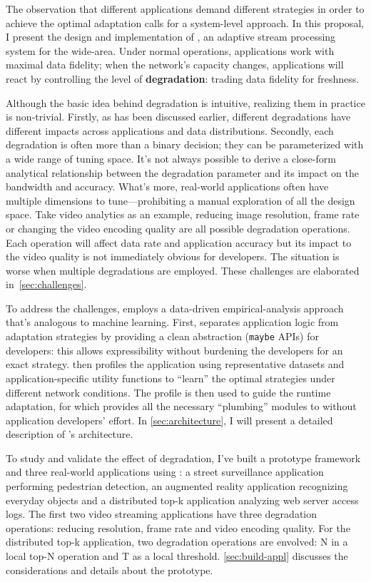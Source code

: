 The observation that different applications demand different strategies in order
to achieve the optimal adaptation calls for a system-level approach. In this
proposal, I present the design and implementation of \sysname{}, an adaptive
stream processing system for the wide-area. Under normal operations, \sysname{}
applications work with maximal data fidelity; when the network's capacity
changes, applications will react by controlling the level of
\textbf{degradation}: trading data fidelity for freshness.

Although the basic idea behind degradation is intuitive, realizing them in
practice is non-trivial. Firstly, as has been discussed earlier, different
degradations have different impacts across applications and data
distributions. Secondly, each degradation is often more than a binary decision;
they can be parameterized with a wide range of tuning space. It's not always
possible to derive a close-form analytical relationship between the degradation
parameter and its impact on the bandwidth and accuracy. What's more, real-world
applications often have multiple dimensions to tune---prohibiting a manual
exploration of all the design space. Take video analytics as an example,
reducing image resolution, frame rate or changing the video encoding quality are
all possible degradation operations. Each operation will affect data rate and
application accuracy but its impact to the video quality is not immediately
obvious for developers. The situation is worse when multiple degradations are
employed. These challenges are elaborated in~\autoref{sec:challenges}.

To address the challenges, \sysname{} employs a data-driven empirical-analysis
approach that's analogous to machine learning.  First, \sysname{} separates
application logic from adaptation strategies by providing a clean abstraction
(\texttt{maybe} APIs) for developers: this allows expressibility without
burdening the developers for an exact strategy. \sysname{} then profiles the
application using representative datasets and application-specific utility
functions to ``learn'' the optimal strategies under different network
conditions. The profile is then used to guide the runtime adaptation, for which
\sysname{} provides all the necessary ``plumbing'' modules to without
application developers' effort. In \autoref{sec:architecture}, I will present a
detailed description of \sysname{}'s architecture.

To study and validate the effect of degradation, I've built a prototype
framework and three real-world applications using \sysname{}: a street
surveillance application performing pedestrian detection, an augmented reality
application recognizing everyday objects and a distributed top-k application
analyzing web server access logs. The first two video streaming applications
have three degradation operations: reducing resolution, frame rate and video
encoding quality. For the distributed top-k application, two degradation
operations are envolved: N in a local top-N operation and T as a local
threshold. \autoref{sec:build-appl} discusses the considerations and details
about the prototype.

